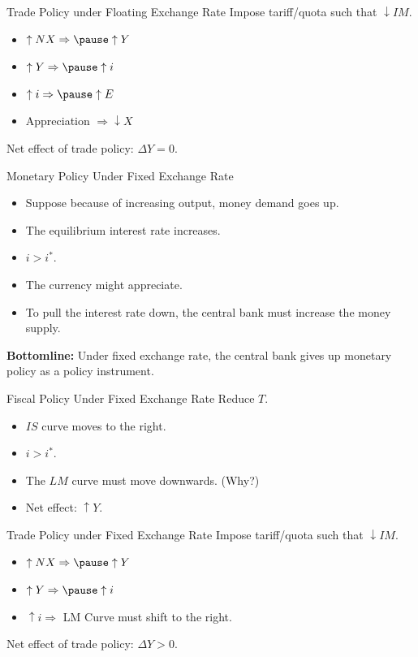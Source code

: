 \documentclass[shownotes,11pt, aspectratio=169]{beamer}
\begin{document}
\begin{frame}{Trade Policy under Floating Exchange Rate}
Impose tariff/quota such that $\downarrow IM$.
\begin{itemize}
\item $\uparrow NX \Rightarrow \pause \uparrow Y$
\pause
\item $\uparrow Y \Rightarrow \pause \uparrow i$
\pause
\item $\uparrow i \Rightarrow \pause \uparrow E$
\pause
\item Appreciation $\Rightarrow \downarrow X$
\end{itemize}
Net effect of trade policy: $\Delta Y = 0$.
\end{frame}

\begin{frame}{Monetary Policy Under Fixed Exchange Rate}
\begin{itemize}
\item Suppose because of increasing output, money demand goes up.
\item The equilibrium interest rate increases.
\item $i > i^{\ast}$.
\item The currency might appreciate. 
\item To pull the interest rate down, \pause the central bank must increase the money supply.
\end{itemize}
\textbf{Bottomline:} Under fixed exchange rate, the central bank gives up monetary policy as a policy instrument. 
\end{frame}

\begin{frame}{Fiscal Policy Under Fixed Exchange Rate}
Reduce $T$.
\begin{itemize}
\item $IS$ curve moves to the right.
\item $i > i^{\ast}$.
\item The $LM$ curve must move downwards. (Why?)
\item Net effect: $\uparrow Y$.
\end{itemize}
\end{frame}

\begin{frame}{Trade Policy under Fixed Exchange Rate}
Impose tariff/quota such that $\downarrow IM$.
\begin{itemize}
\item $\uparrow NX \Rightarrow \pause \uparrow Y$
\pause
\item $\uparrow Y \Rightarrow \pause \uparrow i$
\pause
\item $\uparrow i \Rightarrow $ \pause LM Curve must shift to the right.
\end{itemize}
Net effect of trade policy: $\Delta Y > 0$.
\end{frame}
\end{document}
